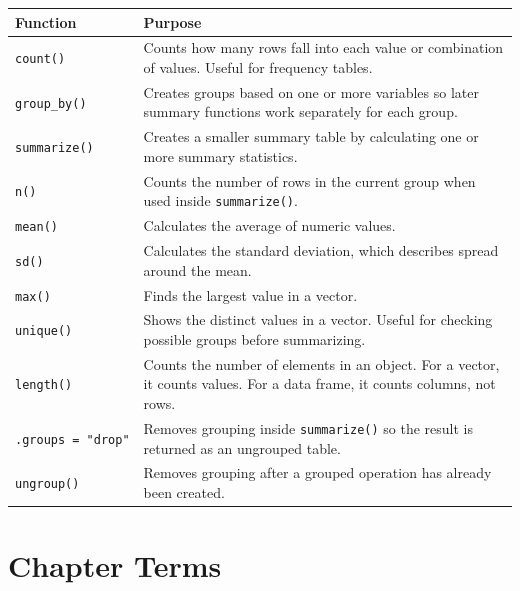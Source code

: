 \documentclass[
]{article}
\newcounter{none} %
\begin{document}
{\def\LTcaptype{none} %
\begin{longtable}[]{@{}
  >{\raggedright\arraybackslash}p{}
  >{\raggedright\arraybackslash}p{}@{}}
\toprule\noalign{}
\begin{minipage}[b]{\linewidth}\raggedright
Function
\end{minipage} & \begin{minipage}[b]{\linewidth}\raggedright
Purpose
\end{minipage} \\
\midrule\noalign{}
\endhead
\bottomrule\noalign{}
\endlastfoot
\texttt{count()} & Counts how many rows fall into each value or
combination of values. Useful for frequency tables. \\
\texttt{group\_by()} & Creates groups based on one or more variables so
later summary functions work separately for each group. \\
\texttt{summarize()} & Creates a smaller summary table by calculating
one or more summary statistics. \\
\texttt{n()} & Counts the number of rows in the current group when used
inside \texttt{summarize()}. \\
\texttt{mean()} & Calculates the average of numeric values. \\
\texttt{sd()} & Calculates the standard deviation, which describes
spread around the mean. \\
\texttt{max()} & Finds the largest value in a vector. \\
\texttt{unique()} & Shows the distinct values in a vector. Useful for
checking possible groups before summarizing. \\
\texttt{length()} & Counts the number of elements in an object. For a
vector, it counts values. For a data frame, it counts columns, not
rows. \\
\texttt{.groups\ =\ "drop"} & Removes grouping inside
\texttt{summarize()} so the result is returned as an ungrouped table. \\
\texttt{ungroup()} & Removes grouping after a grouped operation has
already been created. \\
\end{longtable}
}

\section{Chapter Terms}\label{chapter-terms}
\end{document}
